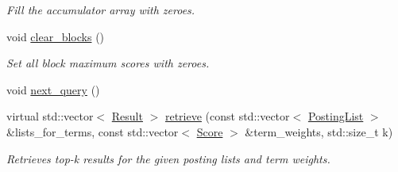 \begin{DoxyCompactItemize}
\begin{DoxyCompactList}\small\item\em Fill the accumulator array with zeroes. \end{DoxyCompactList}\item 
void \hyperlink{classngine_1_1query_1_1TaatRetriever_a817e3b8640ff2dc99614aa201774bb58}{clear\+\_\+blocks} ()
\begin{DoxyCompactList}\small\item\em Set all block maximum scores with zeroes. \end{DoxyCompactList}\item 
void \hyperlink{classngine_1_1query_1_1TaatRetriever_aa8821cfb9b805f6f40541d21451d96e9}{next\+\_\+query} ()
\item 
virtual std\+::vector$<$ \hyperlink{structngine_1_1query_1_1Result}{Result} $>$ \hyperlink{classngine_1_1query_1_1TaatRetriever_a81d0ee715edbd1a105476e4bb7e7273d}{retrieve} (const std\+::vector$<$ \hyperlink{classngine_1_1PostingList}{Posting\+List} $>$ \&lists\+\_\+for\+\_\+terms, const std\+::vector$<$ \hyperlink{structngine_1_1Score}{Score} $>$ \&term\+\_\+weights, std\+::size\+\_\+t k)
\begin{DoxyCompactList}\small\item\em Retrieves top-\/k results for the given posting lists and term weights. \end{DoxyCompactList}\end{DoxyCompactItemize}
